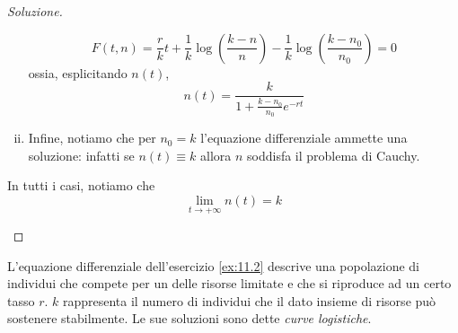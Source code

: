 \begin{proof}[Soluzione]
\begin{enumerate}[(i)]
        \[
        F(t,n) = \frac{r}{k}t+\frac{1}{k}\log\left(\frac{k-n}{n}\right)-\frac{1}{k}\log\left(\frac{k-n_0}{n_0}\right) = 0
        \]
        ossia, esplicitando $n(t)$,
        \[
        n(t) = \frac{k}{1+\frac{k-n_0}{n_0}e^{-rt}}
        \]
        \item Infine, notiamo che per $n_0=k$ l'equazione differenziale ammette una soluzione: infatti se $n(t)\equiv k$ allora $n$ soddisfa il problema di Cauchy.
    \end{enumerate}
    In tutti i casi, notiamo che 
    \[
    \lim_{t\to+\infty} n(t) = k
    \]
    \begin{center}
    \end{center}
\end{proof}
\begin{remark}
    L'equazione differenziale dell'esercizio \ref{ex:11.2} descrive una popolazione di individui che compete per un delle risorse limitate e che si riproduce ad un certo tasso $r$. $k$ rappresenta il numero di individui che il dato insieme di risorse può sostenere stabilmente. Le sue soluzioni sono dette \emph{curve logistiche}. 
\end{remark}
\newpage